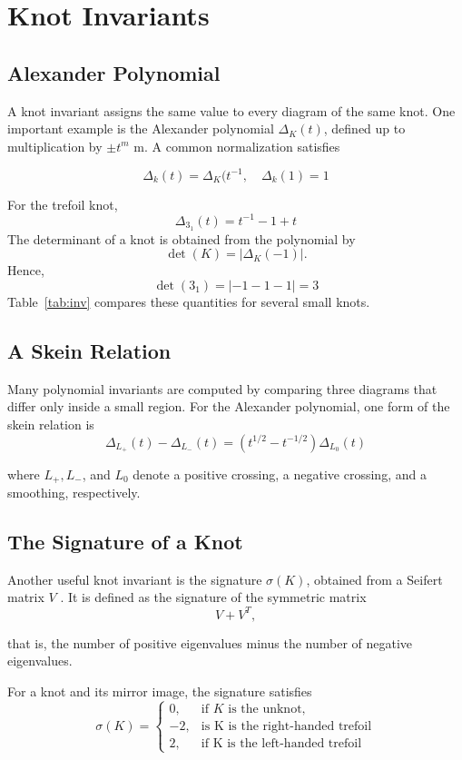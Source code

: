 \section{Knot Invariants}

\subsection{Alexander Polynomial}
A knot invariant assigns the same value to every diagram
of the same knot. One important example is the Alexander polynomial $\Delta_K(t)$, defined up to multiplication by $\pm t^m$
m. A common normalization satisfies

\begin{equation}
    \Delta_k(t) = \Delta_K(t^{-1}, \quad \Delta_k(1)=1
\end{equation}

For the trefoil knot,
\begin{equation}
    \Delta_{3_1} (t) = t^{-1} -1 + t
\end{equation}
The determinant of a knot is obtained from the polynomial by
\begin{equation}
    \det (K) = | \Delta_K(-1)|.
\end{equation}
Hence,
\begin{equation*}
    \det(3_1) = | -1-1-1| = 3
\end{equation*}
Table~\ref{tab:inv} compares these quantities for several small
knots.


\subsection{A Skein Relation}
Many polynomial invariants are computed by comparing
three diagrams that differ only inside a small region. For
the Alexander polynomial, one form of the skein relation
is
\begin{equation}
    \Delta_{L_+} (t) - \Delta_{L_-} (t) = \left( t^{1/2} - t^{-1/2}\right) \Delta_{L_0}(t)
\end{equation}

where $ L_+, L_-$, and $ L_0$ denote a positive crossing, a negative crossing, and a smoothing, respectively.




\subsection{The Signature of a Knot}
Another useful knot invariant is the signature $\sigma(K)$, obtained from a Seifert matrix $V$ . It is defined as the signature of the symmetric matrix
\[
V+V^T,
\]

that is, the number of positive eigenvalues minus the
number of negative eigenvalues.

For a knot and its mirror image, the signature satisfies
\begin{equation}
    \sigma(K) = \begin{cases}
        0, & \text{if $K$ is the unknot,} \\
        -2, & \text{is K is the right-handed trefoil}\\
        2, & \text{if K is the left-handed trefoil}
    \end{cases}
\end{equation}